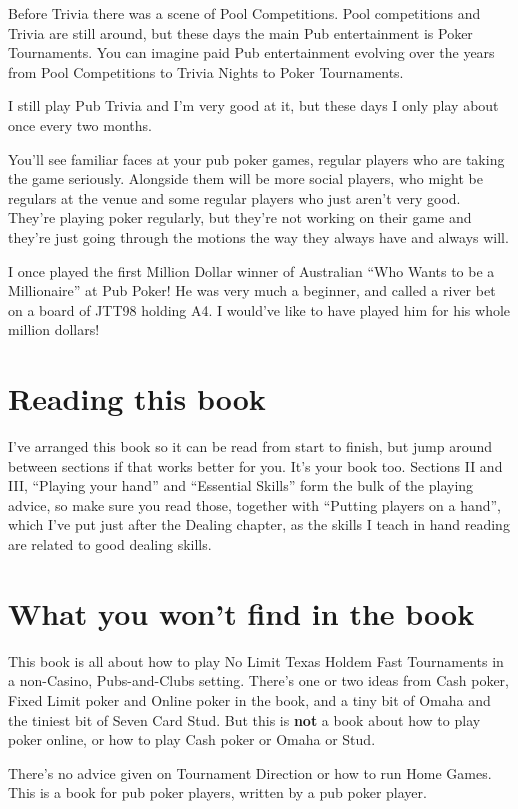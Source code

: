 Before Trivia there was a scene of Pool Competitions. Pool
competitions and Trivia are still around, but these days the main Pub
entertainment is Poker Tournaments. You can imagine paid Pub
entertainment evolving over the years from Pool Competitions to Trivia
Nights to Poker Tournaments.

I still play Pub Trivia and I'm very good at it, but these days
I only play about once every two months.

You'll see familiar faces at your pub poker games,
regular players who are taking the game seriously. Alongside them
will be more social players, who might be regulars at the venue
and some regular players who just aren't very good. They're playing
poker regularly, but they're not working on their game and they're
just going through the motions the way they always have and always
will.

I once played the first Million Dollar winner of Australian ``Who
Wants to be a Millionaire'' at Pub Poker! He was very much a beginner,
and called a river bet on a board of JTT98 holding A4. I would've like
to have played him for his whole million dollars!

\section*{Reading this book}

I've arranged this book so it can be read from start to finish, but jump
around between sections if that works better for you. It's your book too.
Sections II and III, ``Playing your hand'' and ``Essential Skills'' form
the bulk of the playing advice, so make sure you read those, together
with ``Putting players on a hand'', which I've put just after the
Dealing chapter, as the skills I teach in hand reading are related
to good dealing skills.

\section*{What you won't find in the book}

This book is all about how to play No Limit Texas Holdem Fast
Tournaments in a non-Casino, Pubs-and-Clubs setting. There's one or
two ideas from Cash poker, Fixed Limit poker and Online poker in the
book, and a tiny bit of Omaha and the tiniest bit of Seven Card Stud.
But this is \textbf{not} a book about how to play poker online, or how
to play Cash poker or Omaha or Stud.

There's no advice given on Tournament Direction or how to run Home
Games. This is a book for pub poker players, written by a pub poker
player.

